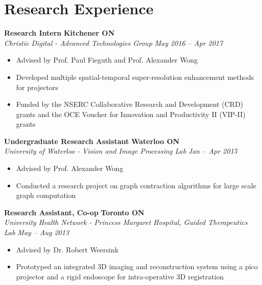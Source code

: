 \section*{Research Experience}
    \vspace{\postsubhead}
      \textbf{Research Intern}
      \hfill
      \textbf{Kitchener ON}\\
      \textit{Christie Digital - Advanced Technologies Group}
      \hfill
      \textit{May 2016 -- Apr 2017}
      \begin{itemize}
        \setlength\itemsep{0.2em}
        \item Advised by Prof. Paul Fieguth and Prof. Alexander Wong
        \item Developed multiple spatial-temporal super-resolution enhancement methods for projectors
        \item Funded by the NSERC Collaborative Research and Development (CRD) grants and the OCE Voucher for Innovation and Productivity II (VIP-II) grants
      \end{itemize}
      \vspace{\interlist}
      \textbf{Undergraduate Research Assistant}
      \hfill
      \textbf{Waterloo ON}\\
      \textit{University of Waterloo - Vision and Image Processing Lab}
      \hfill
      \textit{Jan -- Apr 2015}
      \begin{itemize}
        \setlength\itemsep{0.2em}
        \item Advised by Prof. Alexander Wong
        \item Conducted a research project on graph contraction algorithms for large scale graph computation
      \end{itemize}
      \vspace{\interlist}
      \textbf{Research Assistant, Co-op}
      \hfill
      \textbf{Toronto ON}\\
      \textit{University Health Network - Princess Margaret Hospital, Guided Therapeutics Lab}
      \hfill
      \textit{May -- Aug 2013}
      \begin{itemize}
        \setlength\itemsep{0.2em}
        \item Advised by Dr. Robert Weersink
        \item Prototyped an integrated 3D imaging and reconstruction system using a pico projector and a rigid endoscope for intra-operative 3D registration
      \end{itemize}
      \vspace{\interlist}
